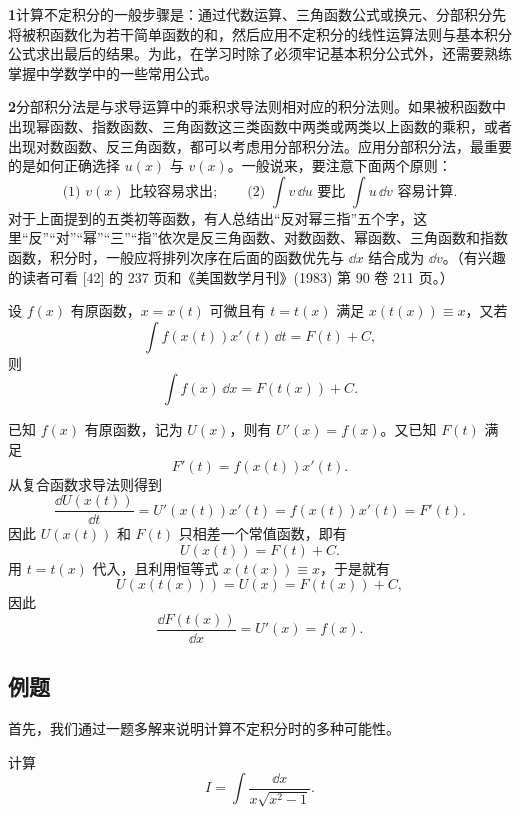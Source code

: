 \begin{xremark}
\textbf{1}\quad 计算不定积分的一般步骤是：通过代数运算、三角函数公式或换元、分部积分先将被积函数化为若干简单函数的和，然后应用不定积分的线性运算法则与基本积分公式求出最后的结果。为此，在学习时除了必须牢记基本积分公式外，还需要熟练掌握中学数学中的一些常用公式。
\end{xremark}

\begin{xremark}
\textbf{2}\quad 分部积分法是与求导运算中的乘积求导法则相对应的积分法则。如果被积函数中出现幂函数、指数函数、三角函数这三类函数中两类或两类以上函数的乘积，或者出现对数函数、反三角函数，都可以考虑用分部积分法。应用分部积分法，最重要的是如何正确选择 $u(x)$ 与 $v(x)$。一般说来，要注意下面两个原则：
\[
  \text{(1) }v(x)\text{ 比较容易求出};
  \qquad
  \text{(2) }\int v\,\dd u\text{ 要比 }\int u\,\dd v\text{ 容易计算}.
\]
对于上面提到的五类初等函数，有人总结出“反对幂三指”五个字，这里“反”“对”“幂”“三”“指”依次是反三角函数、对数函数、幂函数、三角函数和指数函数，积分时，一般应将排列次序在后面的函数优先与 $\dd x$ 结合成为 $\dd v$。（有兴趣的读者可看 [42] 的 237 页和《美国数学月刊》(1983) 第 90 卷 211 页。）
\end{xremark}

\begin{xproposition}[9.1.1（第二换元法的证明）]
设 $f(x)$ 有原函数，$x=x(t)$ 可微且有 $t=t(x)$ 满足 $x(t(x))\equiv x$，又若
\[
  \int f(x(t))x'(t)\,\dd t=F(t)+C,
\]
则
\[
  \int f(x)\,\dd x=F(t(x))+C.
\]
\end{xproposition}

\begin{xproof}
已知 $f(x)$ 有原函数，记为 $U(x)$，则有 $U'(x)=f(x)$。又已知 $F(t)$ 满足
\[
  F'(t)=f(x(t))x'(t).
\]
从复合函数求导法则得到
\[
  \frac{\dd U(x(t))}{\dd t}=U'(x(t))x'(t)=f(x(t))x'(t)=F'(t).
\]
因此 $U(x(t))$ 和 $F(t)$ 只相差一个常值函数，即有
\[
  U(x(t))=F(t)+C.
\]
用 $t=t(x)$ 代入，且利用恒等式 $x(t(x))\equiv x$，于是就有
\[
  U(x(t(x)))=U(x)=F(t(x))+C,
\]
因此
\[
  \frac{\dd F(t(x))}{\dd x}=U'(x)=f(x).
\]
\end{xproof}

\subsection{例题}

首先，我们通过一题多解来说明计算不定积分时的多种可能性。

\begin{xexample}[9.1.1]
计算
\[
  I=\int\frac{\dd x}{x\sqrt{x^2-1}}.
\]
\end{xexample}


